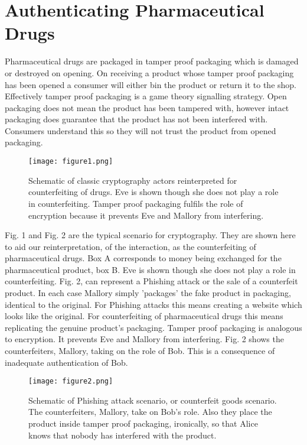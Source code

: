 \documentclass[smallextended]{svjour3}       	\smartqed  \usepackage{graphicx}
\begin{document}
\section{Authenticating Pharmaceutical Drugs}

Pharmaceutical drugs are packaged in tamper proof packaging which is damaged or destroyed on opening. On receiving a product whose tamper proof packaging has been opened a consumer will either bin the product or return it to the shop. Effectively tamper proof packaging is a game theory signalling strategy. Open packaging does not mean the product has been tampered with, however intact packaging does guarantee that the product has not been interfered with. Consumers understand this so they will not trust the product from opened packaging.

\begin{figure}[!ht]
\centering
\texttt{[image: figure1.png]}  \caption{Schematic of classic cryptography actors reinterpreted for counterfeiting of drugs. Eve is shown though she does not play a role in counterfeiting. Tamper proof packaging fulfils the role of encryption because it prevents Eve and Mallory from interfering.}
\label{fig_sim}
\end{figure}

Fig. 1 and Fig. 2 are the typical scenario for cryptography. They are shown here to aid our reinterpretation, of the interaction, as the counterfeiting of pharmaceutical drugs. Box A corresponds to money being exchanged for the pharmaceutical product, box B. Eve is shown though she does not play a role in counterfeiting. Fig. 2, can represent a Phishing attack or the sale of a counterfeit product. In each case Mallory simply 'packages' the fake product in packaging, identical to the original. For Phishing attacks this means creating a website which looks like the original. For counterfeiting of pharmaceutical drugs this means replicating the genuine product's packaging. Tamper proof packaging is analogous to encryption. It prevents Eve and Mallory from interfering. Fig. 2 shows the counterfeiters, Mallory, taking on the role of Bob. This is a consequence of inadequate authentication of Bob.

\begin{figure}[!ht]
\centering
\texttt{[image: figure2.png]}  \caption{Schematic of Phishing attack scenario, or counterfeit goods scenario. The counterfeiters, Mallory, take on Bob's role. Also they place the product inside tamper proof packaging, ironically, so that Alice knows that nobody has interfered with the product.}
\label{fig_sim}
\end{figure}
\end{document}
